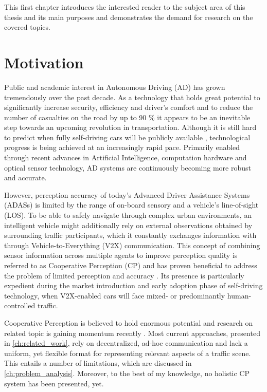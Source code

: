This first chapter introduces the interested reader to the subject area of this thesis and its main purposes and demonstrates the demand for research on the covered topics. 

\section{Motivation}
\label{sec:motivation}
Public and academic interest in Autonomous Driving (AD) has grown tremendously over the past decade. As a technology that holds great potential to significantly increase security, efficiency and driver's comfort and to reduce the number of casualties on the road by up to 90 \% \cite{Markwalter2017} it appears to be an inevitable step towards an upcoming revolution in transportation.
Although it is still hard to predict when fully self-driving cars will be publicly available \cite{Frost&SulivanConsulting2018}, technological progress is being achieved at an increasingly rapid pace. Primarily enabled through recent advances in Artificial Intelligence, computation hardware and optical sensor technology, AD systems are continuously becoming more robust and accurate.
\par
\bigskip

However, perception accuracy of today's Advanced Driver Assistance Systems (ADASs) is limited by the range of on-board sensory and a vehicle's line-of-sight (LOS). To be able to safely navigate through complex urban environments, an intelligent vehicle might additionally rely on external observations obtained by surrounding traffic participants, which it constantly exchanges information with through Vehicle-to-Everything (V2X) communication. This concept of combining sensor information across multiple agents to improve perception quality is referred to as Cooperative Perception (CP) and has proven beneficial to address the problem of limited perception and accuracy \cite{Chen2019, Hohm2019}. Its presence is particularly expedient during the market introduction and early adoption phase of self-driving technology, when V2X-enabled cars will face mixed- or predominantly human-controlled traffic.  
\par
\bigskip

Cooperative Perception is believed to hold enormous potential \cite{Gunther2015} and research on related topic is gaining momentum recently \cite{Chen2019, Thandavarayan2019, Calvo2017, BMWGroup2019}. Most current approaches, presented in \cref{ch:related_work}, rely on decentralized, ad-hoc communication and lack a uniform, yet flexible format for representing relevant aspects of a traffic scene. This entails a number of limitations, which are discussed in \cref{ch:problem_analysis}. Moreover, to the best of my knowledge, no holistic CP system has been presented, yet. 
\par
\bigskip


